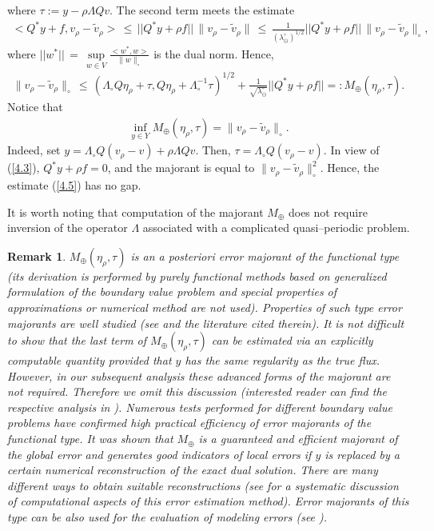 \documentclass[amstex,amstext,amsfonts,epsf,12pt] {amsart}
\newtheorem{remark}[theorem]{Remark}
\newcommand\be{\begin{eqnarray*}}
\newcommand\ee{\end{eqnarray*}}
\newcommand\ben{\begin{eqnarray}}
\newcommand\een{\end{eqnarray}}
\def\be{\begin{eqnarray*}}
\def\ee{\end{eqnarray*}}
\def\ben{\begin{eqnarray}}
\def\een{\end{eqnarray}}
\def\NNN {{\boldsymbol{ |}\!\!|}}
\def\wt{\widetilde}
\def\laomin{{\lambda}^\circ_\ominus}
\begin{document}
where $\tau:=y-\rho \Lambda Q v $. The second term meets the estimate
\be 
<Q^*y+f,v_\rho-\wt v_\rho>\,\leq\,\NNN Q^*y+\rho f \NNN\,\|v_\rho-\wt v_\rho\|\,
\leq\,\frac{1}{(\laomin)^{1/2}}   \NNN Q^*y+\rho f\NNN\,\| v_\rho -\wt v_\rho\|_\circ,
\ee
where
$
\NNN w^*\NNN\,=\,\sup\limits_{w\in V}\frac{<w^*,w>}{\|w\|_\circ}
$
is the dual norm. Hence,
\ben
\label{4.5}
\| v_\rho -\wt v_\rho\|_\circ\,\leq\,\left(
\Lambda_\circ Q\eta_\rho+\tau, 
Q\eta_\rho+\Lambda^{-1}_\circ\tau\right)^{1/2}+\frac{1}{\sqrt{\laomin}}   \NNN Q^*y+\rho f\NNN=:M_\oplus(\eta_\rho,\tau).
\een
Notice that
\be
\inf\limits_{y\in Y}
M_\oplus(\eta_\rho,\tau)=\|v_\rho-\wt v_\rho\|_\circ.
\ee
Indeed, set $y=\Lambda_\circ Q(v_\rho- v)+\rho \Lambda Q v$.
Then, $\tau=\Lambda_\circ Q(v_\rho-v)$. In view of (\ref{4.3}),
$Q^* y+\rho f=0$,
and the majorant is equal to $\|v_\rho-\wt v_\rho\|^2_\circ$.
Hence, the estimate (\ref{4.5}) has no gap. 

It is worth noting that computation of the majorant $M_\oplus$
does not require inversion of the operator $\Lambda$ associated with a complicated quasi--periodic problem.

\begin{remark} 
 $M_\oplus(\eta_\rho,\tau)$ is an a posteriori error majorant
 of the functional type (its derivation is performed by purely functional
 methods based on generalized formulation of the boundary value problem and
 special properties of approximations or numerical method are not used).
Properties of such type error majorants are well studied
(see \cite{Re2000,ReGruyter}  and the literature cited therein). It is not difficult to
show that the last term of $M_\oplus(\eta_\rho,\tau)$ can be estimated
via an explicitly computable quantity provided that $y$ has the same regularity
as the true flux. However, in our subsequent analysis these advanced forms
of the majorant are not required. Therefore we omit this discussion (interested reader can find
the respective analysis in \cite{ReGruyter}). Numerous
tests performed for different boundary value problems have
confirmed high practical efficiency of error majorants of the functional type.  It was shown that  $M_\oplus$ is a guaranteed and efficient majorant of the global 
error and generates good indicators of local 
errors if $y$ is replaced by a certain numerical reconstruction of the exact
dual solution. 
There are many different ways to obtain suitable reconstructions (see \cite{MaNeRe} for a systematic discussion of
computational aspects of this error estimation
method). 
Error majorants of this type  can be also used for the evaluation of modeling errors (see \cite{ReSaSm,ReSaSa2}).
\end{remark}
\end{document}
